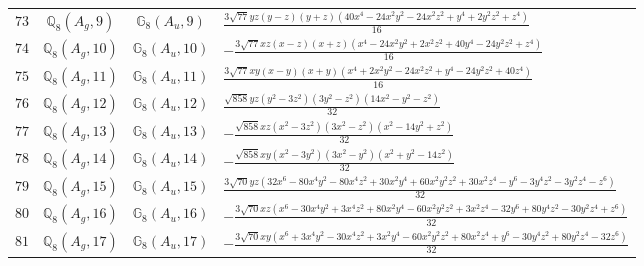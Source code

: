 \documentclass[fleqn,8pt,landscape]{jsarticle}
\begin{document}
\begin{table}[ht!]
\begin{center}
\begin{tabular}{cccl}
$ 73 $ & $ \mathbb{Q}_{8}(A_{g},9) $ & $ \mathbb{G}_{8}(A_{u},9) $ & $ \frac{3 \sqrt{77} y z \left(y - z\right) \left(y + z\right) \left(40 x^{4} - 24 x^{2} y^{2} - 24 x^{2} z^{2} + y^{4} + 2 y^{2} z^{2} + z^{4}\right)}{16} $ \\
$ 74 $ & $ \mathbb{Q}_{8}(A_{g},10) $ & $ \mathbb{G}_{8}(A_{u},10) $ & $ - \frac{3 \sqrt{77} x z \left(x - z\right) \left(x + z\right) \left(x^{4} - 24 x^{2} y^{2} + 2 x^{2} z^{2} + 40 y^{4} - 24 y^{2} z^{2} + z^{4}\right)}{16} $ \\
$ 75 $ & $ \mathbb{Q}_{8}(A_{g},11) $ & $ \mathbb{G}_{8}(A_{u},11) $ & $ \frac{3 \sqrt{77} x y \left(x - y\right) \left(x + y\right) \left(x^{4} + 2 x^{2} y^{2} - 24 x^{2} z^{2} + y^{4} - 24 y^{2} z^{2} + 40 z^{4}\right)}{16} $ \\
$ 76 $ & $ \mathbb{Q}_{8}(A_{g},12) $ & $ \mathbb{G}_{8}(A_{u},12) $ & $ \frac{\sqrt{858} y z \left(y^{2} - 3 z^{2}\right) \left(3 y^{2} - z^{2}\right) \left(14 x^{2} - y^{2} - z^{2}\right)}{32} $ \\
$ 77 $ & $ \mathbb{Q}_{8}(A_{g},13) $ & $ \mathbb{G}_{8}(A_{u},13) $ & $ - \frac{\sqrt{858} x z \left(x^{2} - 3 z^{2}\right) \left(3 x^{2} - z^{2}\right) \left(x^{2} - 14 y^{2} + z^{2}\right)}{32} $ \\
$ 78 $ & $ \mathbb{Q}_{8}(A_{g},14) $ & $ \mathbb{G}_{8}(A_{u},14) $ & $ - \frac{\sqrt{858} x y \left(x^{2} - 3 y^{2}\right) \left(3 x^{2} - y^{2}\right) \left(x^{2} + y^{2} - 14 z^{2}\right)}{32} $ \\
$ 79 $ & $ \mathbb{Q}_{8}(A_{g},15) $ & $ \mathbb{G}_{8}(A_{u},15) $ & $ \frac{3 \sqrt{70} y z \left(32 x^{6} - 80 x^{4} y^{2} - 80 x^{4} z^{2} + 30 x^{2} y^{4} + 60 x^{2} y^{2} z^{2} + 30 x^{2} z^{4} - y^{6} - 3 y^{4} z^{2} - 3 y^{2} z^{4} - z^{6}\right)}{32} $ \\
$ 80 $ & $ \mathbb{Q}_{8}(A_{g},16) $ & $ \mathbb{G}_{8}(A_{u},16) $ & $ - \frac{3 \sqrt{70} x z \left(x^{6} - 30 x^{4} y^{2} + 3 x^{4} z^{2} + 80 x^{2} y^{4} - 60 x^{2} y^{2} z^{2} + 3 x^{2} z^{4} - 32 y^{6} + 80 y^{4} z^{2} - 30 y^{2} z^{4} + z^{6}\right)}{32} $ \\
$ 81 $ & $ \mathbb{Q}_{8}(A_{g},17) $ & $ \mathbb{G}_{8}(A_{u},17) $ & $ - \frac{3 \sqrt{70} x y \left(x^{6} + 3 x^{4} y^{2} - 30 x^{4} z^{2} + 3 x^{2} y^{4} - 60 x^{2} y^{2} z^{2} + 80 x^{2} z^{4} + y^{6} - 30 y^{4} z^{2} + 80 y^{2} z^{4} - 32 z^{6}\right)}{32} $ \\
 \hline \hline
\end{tabular}
\end{center}
\end{table}
\end{document}
